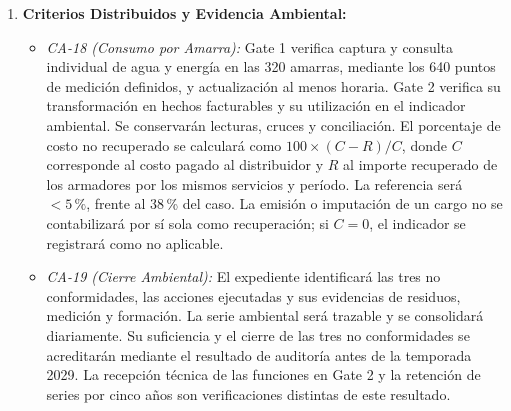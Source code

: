 \begin{enumerate}
\begin{itemize}
        \item \emph{CA-17 (Contratistas):} Acreditación de las 62 empresas y verificación de la documentación y capacitación ambiental y de seguridad vigentes del personal habilitado, incluyendo los 140 operarios identificados en el alcance. Las pruebas comprobarán vigencias y rechazo de accesos sin habilitación, conservando el registro de acreditación y su resultado.

        \item \emph{CA-24 (Continuidad del Plan de Izaje):} Operadores antiguos y nuevos utilizarán el mismo registro de puntos y posiciones de eslingas antes del izaje. La evidencia se capturará con la embarcación en calzos, no suspendida, para registrar el conocimiento sin introducir riesgos durante la maniobra. La prueba verificará la recuperación del plan por ambos operadores y la trazabilidad de su versión.
    \end{itemize}

    \item \textbf{Criterios Distribuidos y Evidencia Ambiental:}
    \begin{itemize}
        \item \emph{CA-18 (Consumo por Amarra):} Gate 1 verifica captura y consulta individual de agua y energía en las 320 amarras, mediante los 640 puntos de medición definidos, y actualización al menos horaria. Gate 2 verifica su transformación en hechos facturables y su utilización en el indicador ambiental. Se conservarán lecturas, cruces y conciliación. El porcentaje de costo no recuperado se calculará como $100 \times (C-R)/C$, donde $C$ corresponde al costo pagado al distribuidor y $R$ al importe recuperado de los armadores por los mismos servicios y período. La referencia será $<5\,\%$, frente al 38\,\% del caso. La emisión o imputación de un cargo no se contabilizará por sí sola como recuperación; si $C=0$, el indicador se registrará como no aplicable.

        \item \emph{CA-19 (Cierre Ambiental):} El expediente identificará las tres no conformidades, las acciones ejecutadas y sus evidencias de residuos, medición y formación. La serie ambiental será trazable y se consolidará diariamente. Su suficiencia y el cierre de las tres no conformidades se acreditarán mediante el resultado de auditoría antes de la temporada 2029. La recepción técnica de las funciones en Gate 2 y la retención de series por cinco años son verificaciones distintas de este resultado.


\end{itemize}
\end{enumerate}
